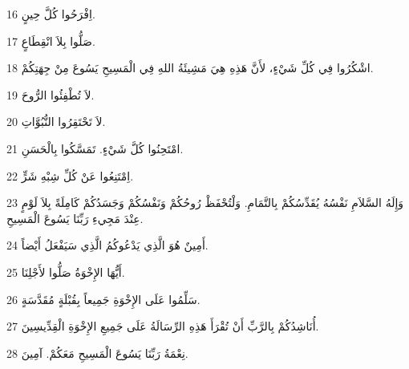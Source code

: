\par 16 اِفْرَحُوا كُلَّ حِينٍ.
\par 17 صَلُّوا بِلاَ انْقِطَاعٍ.
\par 18 اشْكُرُوا فِي كُلِّ شَيْءٍ، لأَنَّ هَذِهِ هِيَ مَشِيئَةُ اللهِ فِي الْمَسِيحِ يَسُوعَ مِنْ جِهَتِكُمْ.
\par 19 لاَ تُطْفِئُوا الرُّوحَ.
\par 20 لاَ تَحْتَقِرُوا النُّبُوَّاتِ.
\par 21 امْتَحِنُوا كُلَّ شَيْءٍ. تَمَسَّكُوا بِالْحَسَنِ.
\par 22 اِمْتَنِعُوا عَنْ كُلِّ شِبْهِ شَرٍّ.
\par 23 وَإِلَهُ السَّلاَمِ نَفْسُهُ يُقَدِّسُكُمْ بِالتَّمَامِ. وَلْتُحْفَظْ رُوحُكُمْ وَنَفْسُكُمْ وَجَسَدُكُمْ كَامِلَةً بِلاَ لَوْمٍ عِنْدَ مَجِيءِ رَبِّنَا يَسُوعَ الْمَسِيحِ.
\par 24 أَمِينٌ هُوَ الَّذِي يَدْعُوكُمُ الَّذِي سَيَفْعَلُ أَيْضاً.
\par 25 أَيُّهَا الإِخْوَةُ صَلُّوا لأَجْلِنَا.
\par 26 سَلِّمُوا عَلَى الإِخْوَةِ جَمِيعاً بِقُبْلَةٍ مُقَدَّسَةٍ.
\par 27 أُنَاشِدُكُمْ بِالرَّبِّ أَنْ تُقْرَأَ هَذِهِ الرِّسَالَةُ عَلَى جَمِيعِ الإِخْوَةِ الْقِدِّيسِينَ.
\par 28 نِعْمَةُ رَبِّنَا يَسُوعَ الْمَسِيحِ مَعَكُمْ. آمِينَ.

